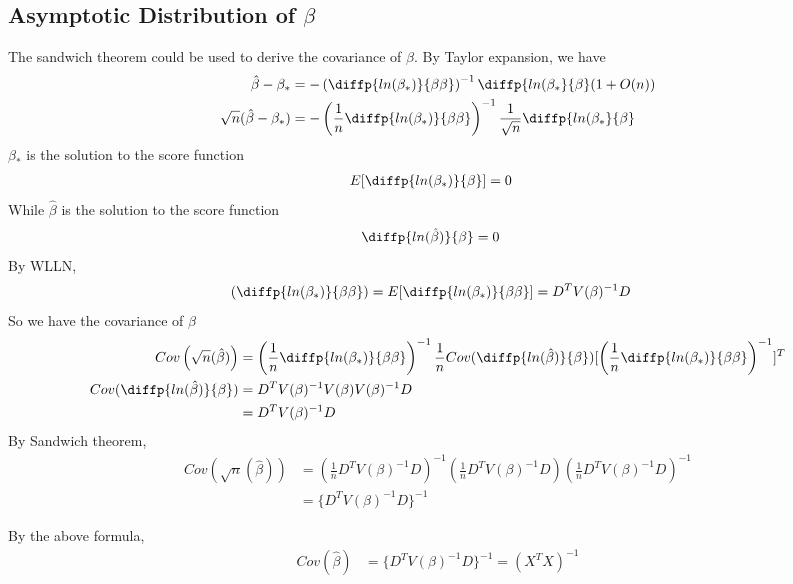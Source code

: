 \subsection{Asymptotic Distribution of $\beta$}
The sandwich theorem could be used to derive the covariance of $\beta$. By Taylor expansion, we have 
\begin{align*}
	\hat{\beta} - \beta_{\ast} &= - \left( \diffp{ln(\beta_{\ast})}{\beta \beta} \right)^{-1} \diffp{ln(\beta_{\ast}}{\beta} (1+O(n)) \\
	\sqrt{n} (\hat{\beta} - \beta_{\ast}) &= - \left(\frac{1}{n} \diffp{ln(\beta_{\ast})}{\beta \beta} \right)^{-1} \frac{1}{\sqrt{n}} \diffp{ln(\beta_{\ast}}{\beta} 
\end{align*}
$\beta_{\ast}$ is the solution to the score function
\begin{align*}
	E[\diffp{ln(\beta_{\ast})}{\beta}] &= 0
\end{align*}
While $\hat{\beta}$ is the solution to the score function
\begin{align*}
	\diffp{ln(\hat{\beta})}{\beta} &= 0
\end{align*}
By WLLN,
\begin{align*}
 \left( \diffp{ln({\beta}_{\ast})}{\beta \beta} \right) & =   E[ \diffp{ln({\beta_{\ast}})}{\beta \beta}] = D^T V(\beta)^{-1} D
\end{align*}
So we have the covariance of $\beta$
\begin{align*}
	Cov \left(\sqrt{n} (\hat{\beta})\right) &= \left(\frac{1}{n} \diffp{ln(\beta_{\ast})}{\beta \beta} \right)^{-1} \frac{1}{n} Cov(\diffp{ln(\hat{\beta})}{\beta})  [\left(\frac{1}{n} \diffp{ln(\beta_{\ast})}{\beta \beta} \right)^{-1}]^T\\
	Cov(\diffp{ln(\hat{\beta})}{\beta})	&= D^T V(\beta)^{-1} V(\beta) V(\beta)^{-1} D\\
	&= D^T V(\beta)^{-1} D
\end{align*}
By Sandwich theorem,
\begin{align*}
	Cov \left(\sqrt{n} (\hat{\beta})\right) &= \left(\frac{1}{n} D^T V(\beta)^{-1} D \right)^{-1} \left(\frac{1}{n} D^T V(\beta)^{-1}  D\right) \left(\frac{1}{n} D^T V(\beta)^{-1} D  \right)^{-1}\\
	&= \{D^T V(\beta)^{-1} D\}^{-1}
\end{align*}

By the above formula, 
\begin{align*}
	Cov (\hat{\beta}) &= \{D^T V(\beta)^{-1} D\}^{-1} = (X^T X)^{-1}
\end{align*}

